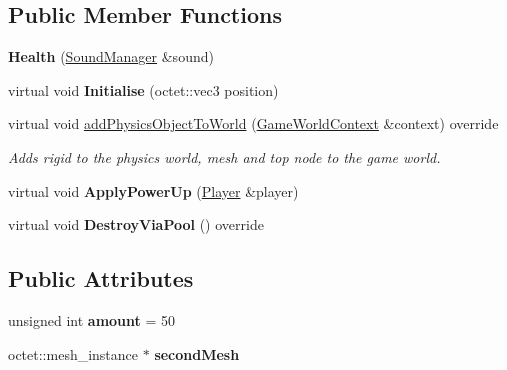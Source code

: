 \subsection*{Public Member Functions}
\begin{DoxyCompactItemize}
\item 
\hypertarget{class_arena_1_1_power_ups_1_1_health_a340c186df737b9b2539d74d62b249682}{{\bfseries Health} (\hyperlink{class_arena_1_1_sound_manager}{Sound\+Manager} \&sound)}\label{class_arena_1_1_power_ups_1_1_health_a340c186df737b9b2539d74d62b249682}

\item 
\hypertarget{class_arena_1_1_power_ups_1_1_health_ad85999098dfc4a68155f5fcb475c8243}{virtual void {\bfseries Initialise} (octet\+::vec3 position)}\label{class_arena_1_1_power_ups_1_1_health_ad85999098dfc4a68155f5fcb475c8243}

\item 
\hypertarget{class_arena_1_1_power_ups_1_1_health_a42a3054c97c611cacc448a94af2ecd71}{virtual void \hyperlink{class_arena_1_1_power_ups_1_1_health_a42a3054c97c611cacc448a94af2ecd71}{add\+Physics\+Object\+To\+World} (\hyperlink{struct_arena_1_1_game_world_context}{Game\+World\+Context} \&context) override}\label{class_arena_1_1_power_ups_1_1_health_a42a3054c97c611cacc448a94af2ecd71}

\begin{DoxyCompactList}\small\item\em Adds rigid to the physics world, mesh and top node to the game world. \end{DoxyCompactList}\item 
\hypertarget{class_arena_1_1_power_ups_1_1_health_afe88bd00520c6618fa85a7130c955d09}{virtual void {\bfseries Apply\+Power\+Up} (\hyperlink{class_arena_1_1_player}{Player} \&player)}\label{class_arena_1_1_power_ups_1_1_health_afe88bd00520c6618fa85a7130c955d09}

\item 
\hypertarget{class_arena_1_1_power_ups_1_1_health_a8db1b4d9d1783ddc1da11e878e9d135d}{virtual void {\bfseries Destroy\+Via\+Pool} () override}\label{class_arena_1_1_power_ups_1_1_health_a8db1b4d9d1783ddc1da11e878e9d135d}

\end{DoxyCompactItemize}
\subsection*{Public Attributes}
\begin{DoxyCompactItemize}
\item 
\hypertarget{class_arena_1_1_power_ups_1_1_health_a1038838c4855b9b65845bc7e5517bcba}{unsigned int {\bfseries amount} = 50}\label{class_arena_1_1_power_ups_1_1_health_a1038838c4855b9b65845bc7e5517bcba}

\item 
\hypertarget{class_arena_1_1_power_ups_1_1_health_a89412df9e452d64d809322594279b25b}{octet\+::mesh\+\_\+instance $\ast$ {\bfseries second\+Mesh}}\label{class_arena_1_1_power_ups_1_1_health_a89412df9e452d64d809322594279b25b}

\end{DoxyCompactItemize}
